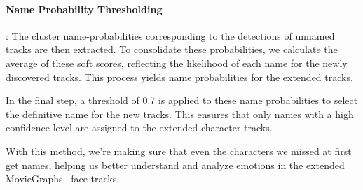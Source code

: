 \paragraph{Name Probability Thresholding}:
The cluster name-probabilities corresponding to the detections of unnamed tracks are then extracted. To consolidate these probabilities, we calculate the average of these soft scores, reflecting the likelihood of each name for the newly discovered tracks. This process yields name probabilities for the extended tracks.

In the final step, a threshold of 0.7 is applied to these name probabilities to select the definitive name for the new tracks. This ensures that only names with a high confidence level are assigned to the extended character tracks.

With this method, we're making sure that even the characters we missed at first get names, helping us better understand and analyze emotions in the extended MovieGraphs~\cite{moviegraphs} face tracks.
